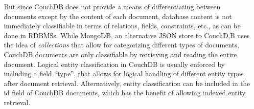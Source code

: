 But since CouchDB does not provide a means of differentiating between documents except by the content of each document, database content is not immediately classifiable in terms of relations, fields, constraints, etc., as can be done in RDBMSs. While MongoDB, an alternative JSON store to CouchD,B uses the idea of \textit{collections} that allow for categorizing different types of documents, CouchDB documents are only classifiable by retrieving and reading the entire document. Logical entity classification in CouchDB is usually enforced by including a field ``type'', that allows for logical handling of different entity types after document retrieval. Alternatively, entity classification can be included in the id field of CouchDB documents, which has the benefit of allowing indexed entity retrieval.